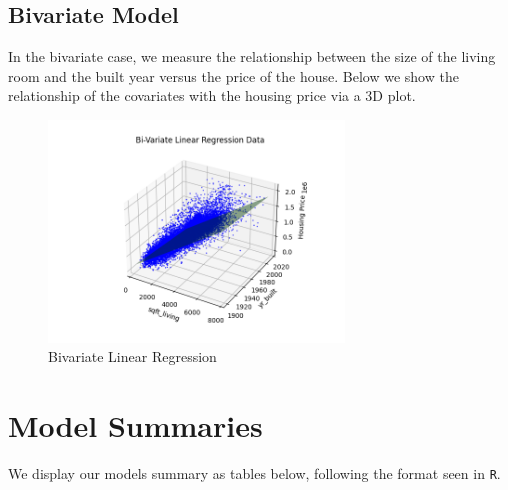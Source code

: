 \documentclass[11pt,a4paper]{article}
\begin{document}
\subsection{Bivariate Model}
In the bivariate case, we measure the relationship between the size of the
living room and the built year versus the price of the house. Below we show the
relationship of the covariates with the housing price via a 3D plot.
\begin{figure}[H]
    \centering
    \includegraphics*[width=0.7\textwidth]{multi_data.png}
    \caption{Bivariate Linear Regression}
    \label{fig: bivariate}
\end{figure}

\newpage

\section{Model Summaries}

We display our models summary as tables below, following the format seen in
\verb|R|.
\end{document}
